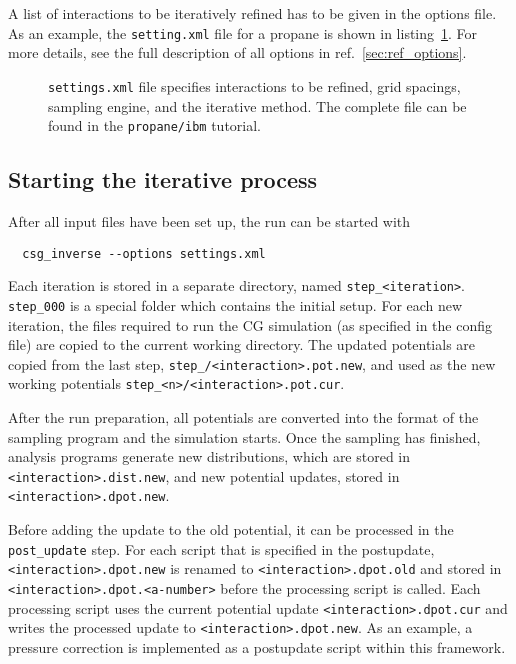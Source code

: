 A list of interactions to be iteratively refined has to be given in the options file. As an example, the \texttt{setting.xml} file for a propane is shown in listing~\ref{list:settings}. For more details,  see the full description of all options in ref.~\ref{sec:ref_options}.
\begin{figure}
\centering
\framebox{

}
\caption{\texttt{settings.xml} file specifies interactions to be refined, grid spacings, sampling engine, and the iterative method. The complete file can be found in the \texttt{propane/ibm} tutorial. 
\label{list:settings}
}
\end{figure}

\subsection{Starting the iterative process}
\label{sec:starting_iterative_process}
After all input files have been set up, the run can be started with
\begin{verbatim}
  csg_inverse --options settings.xml
\end{verbatim}

Each iteration is stored in a separate directory, named \texttt{step\_<iteration>}. \texttt{step\_000} is a special folder which contains the initial setup. For each new iteration, the files required to run the CG simulation (as specified in the config file) are copied to the current working directory. The updated potentials  are copied from the last step, \texttt{step\_<n-1>/<interaction>.pot.new}, and used as the new working potentials \texttt{step\_<n>/<interaction>.pot.cur}.

After the run preparation, all potentials are converted into the format of the sampling program and the simulation starts. Once the sampling has finished, analysis programs generate new distributions, which are stored in \texttt{<interaction>.dist.new}, and new potential updates, stored in \texttt{<interaction>.dpot.new}. 

Before adding the update to the old potential, it can be processed in the \texttt{post\_update} step. For each script that is specified in the postupdate, \texttt{<interaction>.dpot.new} is renamed  to \texttt{<interaction>.dpot.old} and stored in \texttt{<interaction>.dpot.<a-number>} before the processing script is called. Each processing script  uses the current potential update \texttt{<interaction>.dpot.cur} and writes the processed update to \texttt{<interaction>.dpot.new}. As an example, a pressure correction is implemented as a postupdate script within this framework.

